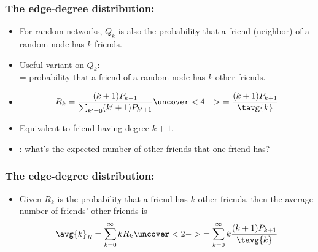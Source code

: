 \begin{frame}[label=]
  \frametitle{The edge-degree distribution:}

    \begin{itemize}
    \item<1-> 
      For random networks, $Q_k$ is also the probability
      that a friend (neighbor) of a random node has \alert{$k$ friends}.
    \item<2-> 
      Useful variant on $Q_k$:\\
      \bigskip
      = probability that a friend of a random node
      has \alert{$k$ other friends}.
    \item<3->
      $$
      R_k
      =
      \frac{(k+1)P_{k+1}}
      {\sum_{k'=0} (k'+1) P_{k'+1}}
      \uncover<4->{
        =
        \frac{(k+1)P_{k+1}}
        {\tavg{k}}
      }
      $$
    \item<5->
      Equivalent to friend having degree $k+1$.
    \item<6->
      : what's the expected
      number of other friends that one friend has?
    \end{itemize}

\end{frame}

\begin{frame}[label=]
  \frametitle{The edge-degree distribution:}
  \small
    \begin{itemize}
    \item<1-> Given $R_k$ is the probability that a friend
      has $k$ other friends, then the average number of
      \alert{friends' other friends} is
      $$
      \avg{k}_{R}
      =
      \sum_{k=0}^{\infty}
      k R_k
      \uncover<2->{
        =
        \sum_{k=0}^{\infty}
        k
        \frac{(k+1)P_{k+1}}
        {\tavg{k}}
      }
      $$
    \end{itemize}

\end{frame}

